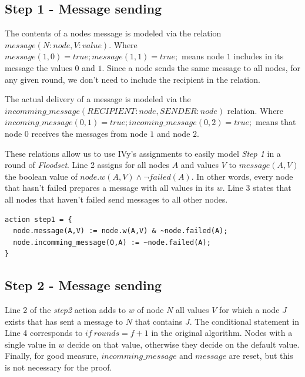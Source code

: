 \documentclass[fleqn]{article}
\begin{document}
\subsection{Step 1 - Message sending}
The contents of a nodes message is modeled via the relation $message(N:node,V:value)$. Where
$message(1,0) = true; message(1,1) = true;$ means node $1$ includes in its message the values $0$ and $1$.
Since a node sends the same message to all nodes, for any given round, we don't need to include the
recipient in the relation.

The actual delivery of a message is modeled via the $incomming\_message(RECIPIENT:node,SENDER:node)$ relation. Where $incoming\_message(0,1) = true; incoming\_message(0,2) = true;$ means that node $0$ receives the messages from node $1$ and node $2$.

These relations allow us to use IVy's assignments to easily model \textit{Step 1} in a round of \textit{Floodset}.
Line 2 assigns for all nodes $A$ and values $V$ to $message(A,V)$ the boolean value of $node.w(A,V) \land \neg failed(A)$. In other words, every node that hasn't failed prepares a message with all values in its $w$. Line 3 states that all nodes that haven't failed send messages to all other nodes.

\begin{mdframed}[backgroundcolor=light-gray, roundcorner=10pt,leftmargin=1, rightmargin=1, innerleftmargin=15, innertopmargin=15,innerbottommargin=15, outerlinewidth=1, linecolor=light-gray]
\begin{lstlisting}
action step1 = {
  node.message(A,V) := node.w(A,V) & ~node.failed(A);
  node.incomming_message(O,A) := ~node.failed(A);
}
\end{lstlisting}
\end{mdframed}

\subsection{Step 2 - Message sending}

Line 2 of the \textit{step2} action adds to $w$ of node $N$ all values $V$ for which a node $J$ exists that has sent a message to $N$ that contains $J$.
The conditional statement in Line 4 corresponds to $if\ rounds = f+1$ in the original algorithm. Nodes with a single value in $w$ decide on that value, otherwise
they decide on the default value.
Finally, for good measure, $incomming\_message$ and $message$ are reset, but this is not necessary for the proof.
\end{document}

